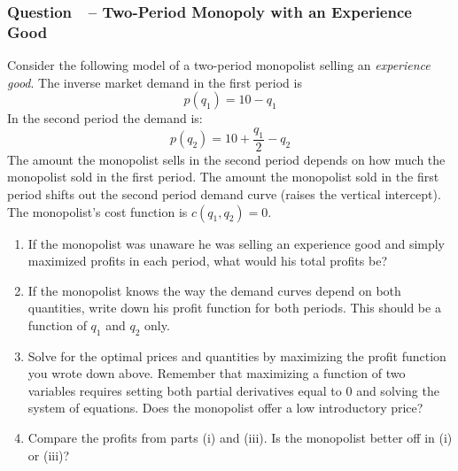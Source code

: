 \documentclass[12pt]{article}
\newcommand{\topic}[1]{\medskip\begin{center}\large\textsc{#1}\normalsize
  \end{center}}
\newcounter{question}[section]
\newcommand{\question}[1]{\refstepcounter{question}
  \subsubsection*{Question~\thequestion~-- #1}}
\newenvironment{subquestions}{
  \begin{enumerate}[label=(\roman*)]}{\end{enumerate}}
\begin{document}
\question{Two-Period Monopoly with an Experience Good}
Consider the following model of a two-period monopolist selling an
\emph{experience good}. The inverse market demand in the first period is
\[
  p\left( q_1 \right) =10-q_1
\]
In the second period the demand is:
\[
  p\left( q_2 \right) = 10+\frac{q_1}{2}-q_2
\]
The amount the monopolist sells in the second period depends on how much the
monopolist sold in the first period. The amount the monopolist sold in the
first period shifts out the second period demand curve (raises the vertical
intercept). The monopolist's cost function is $c\left( q_1,q_2 \right)=0$.
\begin{subquestions}
  \item If the monopolist was unaware he was selling an experience good and
    simply maximized profits in each period, what would his total profits be?
  \item If the monopolist knows the way the demand curves depend on both
    quantities, write down his profit function for both periods. This should be
    a function of $q_1$ and $q_2$ only.
  \item Solve for the optimal prices and quantities by maximizing the profit
    function you wrote down above. Remember that maximizing a function of two
    variables requires setting both partial derivatives equal to 0 and solving
    the system of equations. Does the monopolist offer a low introductory
    price?
  \item Compare the profits from parts (i) and (iii). Is the monopolist better
    off in (i) or (iii)?
\end{subquestions}

\end{document}
